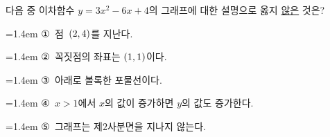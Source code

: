 다음 중 이차함수 $y=3x^2-6x+4$의 그래프에 대한 설명으로 옳지 \underline{않은} 것은?
\par\medskip\par\noindent\hangindent=1.4em {\small ①}\ 점~$(2{,}\mkern3mu 4)$를 지난다.\par\noindent\hangindent=1.4em {\small ②}\ 꼭짓점의 좌표는 $(1{,}\mkern3mu 1)$이다.\par\noindent\hangindent=1.4em {\small ③}\ 아래로 볼록한 포물선이다.\par\noindent\hangindent=1.4em {\small ④}\ $x>1$에서 $x$의 값이 증가하면 $y$의 값도 증가한다.\par\noindent\hangindent=1.4em {\small ⑤}\ 그래프는 제$2$사분면을 지나지 않는다.\par\medskip
